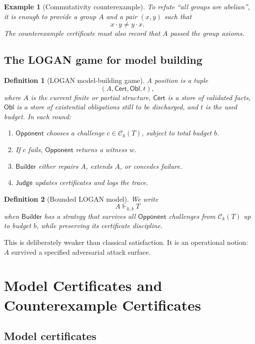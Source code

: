 \documentclass[11pt]{article}
\newtheorem{definition}{Definition}[section]
\newtheorem{example}{Example}[section]
\newcommand{\Builder}{\ensuremath{\mathsf{Builder}}}
\newcommand{\Opponent}{\ensuremath{\mathsf{Opponent}}}
\newcommand{\Judge}{\ensuremath{\mathsf{Judge}}}
\newcommand{\Cert}{\ensuremath{\mathsf{Cert}}}
\newcommand{\Obl}{\ensuremath{\mathsf{Obl}}}
\newcommand{\C}{\mathcal{C}}
\newcommand{\modelslog}{\Vdash}
\begin{document}
\begin{example}[Commutativity counterexample]
To refute ``all groups are abelian'', it is enough to provide a group \(A\) and a pair \((x,y)\) such that
\[
  x\cdot y \neq y\cdot x.
\]
The counterexample certificate must also record that \(A\) passed the group axioms.
\end{example}

\subsection{The LOGAN game for model building}

\begin{definition}[LOGAN model-building game]\label{def:game}
A position is a tuple
\[
  (A,\Cert,\Obl,t),
\]
where \(A\) is the current finite or partial structure, \(\Cert\) is a store of validated facts, \(\Obl\) is a store of existential obligations still to be discharged, and \(t\) is the used budget.  In each round:
\begin{enumerate}[leftmargin=2em]
  \item \Opponent{} chooses a challenge \(c\in \C_k(T)\), subject to total budget \(b\).
  \item If \(c\) fails, \Opponent{} returns a witness \(w\).
  \item \Builder{} either repairs \(A\), extends \(A\), or concedes failure.
  \item \Judge{} updates certificates and logs the trace.
\end{enumerate}
\end{definition}

\begin{definition}[Bounded LOGAN model]
We write
\[
  A \modelslog_{k,b} T
\]
when \Builder{} has a strategy that survives all \Opponent{} challenges from \(\C_k(T)\) up to budget \(b\), while preserving its certificate discipline.
\end{definition}

This is deliberately weaker than classical satisfaction.  It is an operational notion: \(A\) survived a specified adversarial attack surface.

\section{Model Certificates and Counterexample Certificates}

\subsection{Model certificates}
\end{document}
